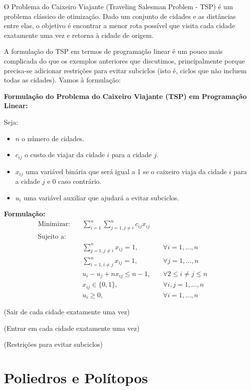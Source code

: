 \documentclass[]{article}
\theoremstyle{definition}
\theoremstyle{definition}
\begin{document}
O Problema do Caixeiro Viajante (Traveling Salesman Problem - TSP) é um problema clássico de otimização. Dado um conjunto de cidades e as distâncias entre elas, o objetivo é encontrar a menor rota possível que visita cada cidade exatamente uma vez e retorna à cidade de origem.

A formulação do TSP em termos de programação linear é um pouco mais complicada do que os exemplos anteriores que discutimos, principalmente porque precisa-se adicionar restrições para evitar subciclos (isto é, ciclos que não incluem todas as cidades). Vamos à formulação:


\textbf{Formulação do Problema do Caixeiro Viajante (TSP) em Programação Linear:}

Seja:
\begin{itemize}
	\item \( n \) o número de cidades.
	\item \( c_{ij} \) o custo de viajar da cidade \( i \) para a cidade \( j \).
	\item \( x_{ij} \) uma variável binária que será igual a 1 se o caixeiro viaja da cidade \( i \) para a cidade \( j \) e 0 caso contrário.
	\item \( u_i \) uma variável auxiliar que ajudará a evitar subciclos.
\end{itemize}

\textbf{Formulação:}
\begin{align*}
\text{Minimizar:} \quad & \sum_{i=1}^{n} \sum_{j=1, j \neq i}^{n} c_{ij} x_{ij} \\
\text{Sujeito a:} \\
& \sum_{j=1, j \neq i}^{n} x_{ij} = 1, \quad & \forall i = 1, \dots, n \quad\\
& \sum_{i=1, i \neq j}^{n} x_{ij} = 1, \quad & \forall j = 1, \dots, n \quad \\
& u_i - u_j + nx_{ij} \leq n-1, \quad & \forall 2 \leq i \neq j \leq n \quad \\
& x_{ij} \in \{0,1\}, \quad & \forall i,j = 1, \dots, n \\
& u_i \geq 0, \quad & \forall i = 1, \dots, n
\end{align*}

(Sair de cada cidade exatamente uma vez)

(Entrar em cada cidade exatamente uma vez)

(Restrições para evitar subciclos)


\section{Poliedros e Polítopos}
\end{document}
